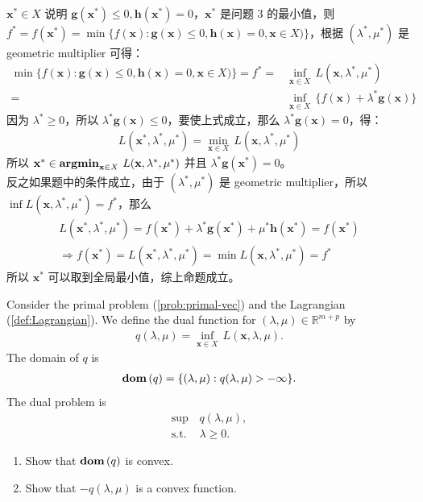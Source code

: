 \documentclass[11pt,letter,notitlepage]{article}
\DeclareMathOperator*{\argmin}{\bf argmin}
\DeclareMathOperator*{\dom}{\bf dom\,}
\begin{document}
\begin{solution}
	\heiti
	\ \\
	$\mathbf{x}^* \in X$ 说明 $\mathbf{g}(\mathbf{x^*}) \leqslant 0, \mathbf{h}(\mathbf{x^*}) = 0$，$\mathbf{x}^*$ 是问题 3 的最小值，则 $f^* = f(\mathbf{x}^*) = \min\{f(\mathbf{x}):\mathbf{g}(\mathbf{x})\leq0,\mathbf{h}(\mathbf{x})=0,\mathbf{x}\in X)\}$，根据 $(\lambda^*,\mu^*)$ 是 geometric multiplier 可得：
	\begin{align*}
		\min\{f(\mathbf{x}):\mathbf{g}(\mathbf{x})\leq0,\mathbf{h}(\mathbf{x})=0,\mathbf{x}\in X)\} = f^* = & \inf_{\mathbf{x}\in X}\,L(\mathbf{x},\lambda^*,\mu^*)\\
		= & \inf_{\mathbf{x}\in X}\,\{f(\mathbf{x})+\lambda^* \mathbf{g}(\mathbf{x})\}
	\end{align*}
	因为 $\lambda^* \geqslant 0$，所以 $\lambda^* \mathbf{g}(\mathbf{x}) \leqslant 0$，要使上式成立，那么 $\lambda^* \mathbf{g}(\mathbf{x}) = 0$，得：
	\begin{align*}
		L(\mathbf{x}^*,\lambda^*,\mu^*) = \min_{\mathbf{x}\in X}\,L(\mathbf{x},\lambda^*,\mu^*)
	\end{align*}
	所以 $\mathbf{x}^*\in\argmin_{\mathbf{x}\in X}\,L(\mathbf{x},\lambda^*,\mu^*)$ 并且 $\lambda^* \mathbf{g}(\mathbf{x}^*) = 0$。\\
	反之如果题中的条件成立，由于 $(\lambda^*,\mu^*)$ 是 geometric multiplier，所以 $\inf L(\mathbf{x}, \lambda^*, \mu^*) = f^*$，那么
	\begin{align*}
		L(\mathbf{x}^*,\lambda^*,\mu^*) = f(\mathbf{x}^*) + \lambda^*\mathbf{g}(\mathbf{x}^*) + \mu^*\mathbf{h}(\mathbf{x}^*) = f(\mathbf{x}^*)\\
		\Rightarrow f(\mathbf{x}^*) = L(\mathbf{x}^*,\lambda^*,\mu^*) = \min L(\mathbf{x},\lambda^*,\mu^*) = f^*
	\end{align*}
	所以 $\mathbf{x}^*$ 可以取到全局最小值，综上命题成立。
\end{solution}

\newpage
\begin{exercise}
Consider the primal problem (\ref{prob:primal-vec}) and the Lagrangian (\ref{def:Lagrangian}). We define the dual function for $(\lambda,\mu)\in\mathbb{R}^{m+p}$ by
\begin{align*}
	q(\lambda,\mu)=\inf_{\mathbf{x}\in X}\,L(\mathbf{x},\lambda,\mu).
\end{align*}
The domain of $q$ is 
\begin{align*}
    \dom(q)=\{(\lambda,\mu):q(\lambda,\mu)>-\infty\}.
\end{align*}
The dual problem is
\begin{align*}
	\sup\,&q(\lambda,\mu),\\
	\mbox{s.t. }&\lambda\geq0.
\end{align*}
\begin{enumerate}
    \item Show that $\dom(q)$ is convex.
    \item Show that $-q(\lambda,\mu)$ is a convex function.
\end{enumerate}
\end{exercise}
\end{document}

